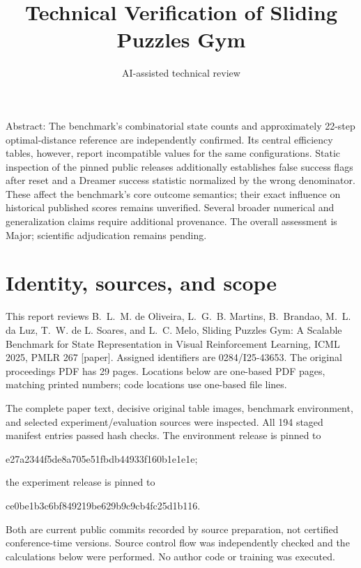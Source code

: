 \documentclass[10pt]{article}
\title{Technical Verification of Sliding Puzzles Gym}
\author{AI-assisted technical review}
\date{}
\begin{document}
\maketitle
Abstract: The benchmark’s combinatorial state counts and approximately 22-step optimal-distance reference are independently confirmed. Its central efficiency tables, however, report incompatible values for the same configurations. Static inspection of the pinned public releases additionally establishes false success flags after reset and a Dreamer success statistic normalized by the wrong denominator. These affect the benchmark’s core outcome semantics; their exact influence on historical published scores remains unverified. Several broader numerical and generalization claims require additional provenance. The overall assessment is Major; scientific adjudication remains pending.\par
\section*{Identity, sources, and scope}
This report reviews B. L. M. de Oliveira, L. G. B. Martins, B. Brandao, M. L. da Luz, T. W. de L. Soares, and L. C. Melo, Sliding Puzzles Gym: A Scalable Benchmark for State Representation in Visual Reinforcement Learning, ICML 2025, PMLR 267 [paper]. Assigned identifiers are 0284/I25-43653. The original proceedings PDF has 29 pages. Locations below are one-based PDF pages, matching printed numbers; code locations use one-based file lines.\par
The complete paper text, decisive original table images, benchmark environment, and selected experiment/evaluation sources were inspected. All 194 staged manifest entries passed hash checks. The environment release is pinned to\par
e27a2344f5de8a705e51fbdb44933f160b1e1e1e;\par
the experiment release is pinned to\par
ce0be1b3c6bf849219be629b9c9cb4fc25d1b116.\par
Both are current public commits recorded by source preparation, not certified conference-time versions. Source control flow was independently checked and the calculations below were performed. No author code or training was executed.\par
\end{document}
